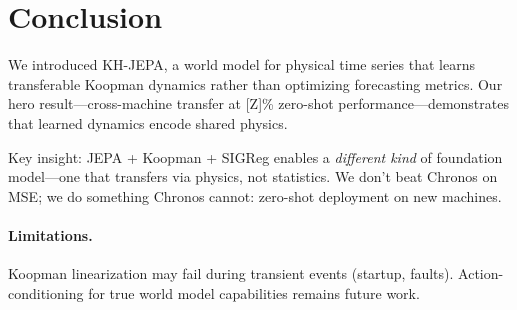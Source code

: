 \documentclass{article}
\begin{document}
\section{Conclusion}

We introduced KH-JEPA, a world model for physical time series that learns transferable Koopman dynamics rather than optimizing forecasting metrics. Our hero result—cross-machine transfer at [Z]\% zero-shot performance—demonstrates that learned dynamics encode shared physics.

Key insight: JEPA + Koopman + SIGReg enables a \emph{different kind} of foundation model—one that transfers via physics, not statistics. We don't beat Chronos on MSE; we do something Chronos cannot: zero-shot deployment on new machines.

\paragraph{Limitations.} Koopman linearization may fail during transient events (startup, faults). Action-conditioning for true world model capabilities remains future work.



\end{document}
